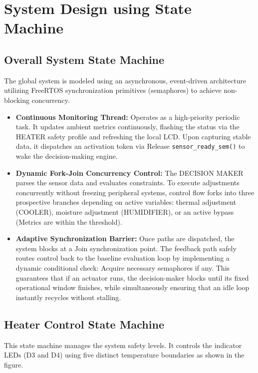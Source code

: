 \section{System Design using State Machine}
\subsection{Overall System State Machine}

The global system is modeled using an asynchronous, event-driven architecture utilizing FreeRTOS synchronization
primitives (semaphores) to achieve non-blocking concurrency.

\begin{itemize}
  \item \textbf{Continuous Monitoring Thread:} Operates as a high-priority periodic task. It updates ambient metrics
        continuously, flashing the status via the HEATER safety profile and refreshing the local LCD. Upon capturing
        stable data, it dispatches an activation token via Release \texttt{sensor\_ready\_sem()} to wake the decision-making
        engine.
  \item \textbf{Dynamic Fork-Join Concurrency Control:} The DECISION MAKER parses the sensor data and evaluates
        constraints. To execute adjustments concurrently without freezing peripheral systems, control flow forks into
        three prospective branches depending on active variables: thermal adjustment (COOLER), moisture adjustment
        (HUMIDIFIER), or an active bypass (Metrics are within the threshold).
  \item \textbf{Adaptive Synchronization Barrier:} Once paths are dispatched, the system blocks at a Join synchronization
        point. The feedback path safely routes control back to the baseline evaluation loop by implementing a dynamic
        conditional check: Acquire necessary semaphores if any. This guarantees that if an actuator runs, the
        decision-maker blocks until its fixed operational window finishes, while simultaneously ensuring that an idle
        loop instantly recycles without stalling.
\end{itemize}

\subsection{Heater Control State Machine}

This state machine manages the system safety levels. It controls the indicator LEDs (D3 and D4) using five distinct
temperature boundaries as shown in the figure.

